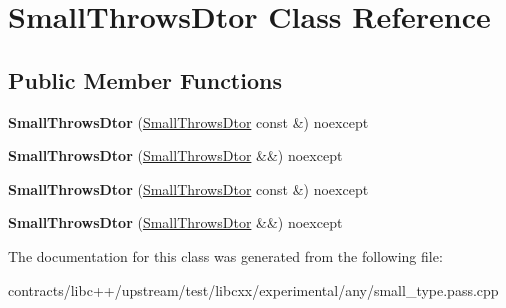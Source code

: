 \hypertarget{class_small_throws_dtor}{}\section{Small\+Throws\+Dtor Class Reference}
\label{class_small_throws_dtor}
\subsection*{Public Member Functions}
\begin{DoxyCompactItemize}
\item 
\mbox{\label{class_small_throws_dtor_aa6d804c9ccc57e5d70fa338fd01e8866}} 
{\bfseries Small\+Throws\+Dtor} (\mbox{\hyperlink{class_small_throws_dtor}{Small\+Throws\+Dtor}} const \&) noexcept
\item 
\mbox{\label{class_small_throws_dtor_a2d68f6a4410dc7d2454b6d3fd15a1ad5}} 
{\bfseries Small\+Throws\+Dtor} (\mbox{\hyperlink{class_small_throws_dtor}{Small\+Throws\+Dtor}} \&\&) noexcept
\item 
\mbox{\label{class_small_throws_dtor_aa6d804c9ccc57e5d70fa338fd01e8866}} 
{\bfseries Small\+Throws\+Dtor} (\mbox{\hyperlink{class_small_throws_dtor}{Small\+Throws\+Dtor}} const \&) noexcept
\item 
\mbox{\label{class_small_throws_dtor_a2d68f6a4410dc7d2454b6d3fd15a1ad5}} 
{\bfseries Small\+Throws\+Dtor} (\mbox{\hyperlink{class_small_throws_dtor}{Small\+Throws\+Dtor}} \&\&) noexcept
\end{DoxyCompactItemize}


The documentation for this class was generated from the following file\+:\begin{DoxyCompactItemize}
\item 
contracts/libc++/upstream/test/libcxx/experimental/any/small\+\_\+type.\+pass.\+cpp\end{DoxyCompactItemize}
